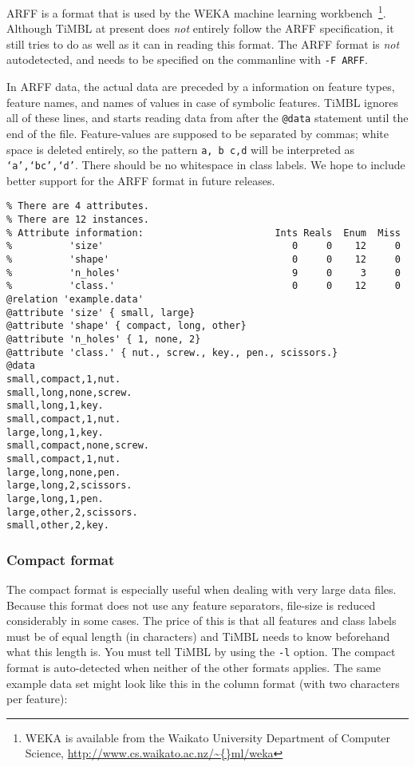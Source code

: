 \documentclass{report}
\begin{document}
ARFF is a format that is used by the WEKA machine learning
workbench~\cite{Garner95,Witten+99}\footnote{WEKA is available from
the Waikato University Department of Computer Science, \url{http://www.cs.waikato.ac.nz/\~{}ml/weka}}.  Although TiMBL at present
does {\em not}\/ entirely follow the ARFF specification, it still
tries to do as well as it can in reading this format. The ARFF format
is {\em not}\/ autodetected, and needs to be specified on the
commanline with {\tt -F ARFF}.


In ARFF data, the actual data are preceded by a information on feature
types, feature names, and names of values in case of symbolic
features. TiMBL ignores all of these lines, and starts reading data
from after the {\tt @data} statement until the end of the
file. Feature-values are supposed to be separated by commas; white
space is deleted entirely, so the pattern {\tt a, b c,d} will be
interpreted as {\tt `a',`bc',`d'}. There should be no whitespace in
class labels.  We hope to include better support for the ARFF format
in future releases.

\begin{footnotesize}
\begin{verbatim}
% There are 4 attributes.
% There are 12 instances.
% Attribute information:                       Ints Reals  Enum  Miss
%          'size'                                 0     0    12     0   
%          'shape'                                0     0    12     0   
%          'n_holes'                              9     0     3     0   
%          'class.'                               0     0    12     0   
@relation 'example.data'
@attribute 'size' { small, large}
@attribute 'shape' { compact, long, other}
@attribute 'n_holes' { 1, none, 2}
@attribute 'class.' { nut., screw., key., pen., scissors.}
@data
small,compact,1,nut.
small,long,none,screw.
small,long,1,key.
small,compact,1,nut.
large,long,1,key.
small,compact,none,screw.
small,compact,1,nut.
large,long,none,pen.
large,long,2,scissors.
large,long,1,pen.
large,other,2,scissors.
small,other,2,key.
\end{verbatim}
\end{footnotesize}

\subsubsection{Compact format}
\label{compactformat}

The compact format is especially useful when dealing with very large
data files. Because this format does not use any feature separators,
file-size is reduced considerably in some cases. The price of this is
that all features and class labels must be of equal length (in
characters) and TiMBL needs to know beforehand what this length
is. You must tell TiMBL by using the {\tt -l} option. The compact
format is auto-detected when neither of the other formats applies. The
same example data set might look like this in the column format (with
two characters per feature):
\end{document}
